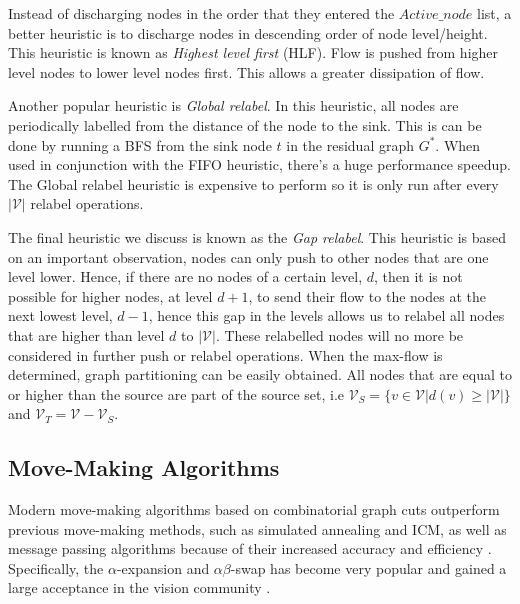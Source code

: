 Instead of discharging nodes in the order that they entered the $Active\_node$ list, a better heuristic is to discharge nodes in descending order of node level/height. This heuristic is known as \textit{Highest level first} (HLF). Flow is pushed from higher level nodes to lower level nodes first. This allows a greater dissipation of flow.

Another popular heuristic is \textit{Global relabel}. In this heuristic, all nodes are periodically labelled from the distance of the node to the sink. This is can be done by running a BFS from the sink node $t$ in the residual graph $G^*$. When used in conjunction with the FIFO heuristic, there's a huge performance speedup. The Global relabel heuristic is expensive to perform so it is only run after every $|\mathcal{V}|$ relabel operations. 

The final heuristic we discuss is known as the \textit{Gap relabel}. This heuristic is based on an important observation, nodes can only push to other nodes that are one level lower. Hence, if there are no nodes of a certain level, $d$, then it is not possible for higher nodes, at level $d+1$, to send their flow to the nodes at the next lowest level, $d-1$, hence this gap in the levels allows us to relabel all nodes that are higher than level $d$ to $|\mathcal{V}|$. These relabelled nodes will no more be considered in further \textsf{push} or \textsf{relabel} operations. When the max-flow is determined, graph partitioning can be easily obtained. All nodes that are equal to or higher than the source are part of the source set, i.e $\mathcal{V}_S=\{v \in \mathcal{V} | d(v)\geq |\mathcal{V}|\}$ and $\mathcal{V}_T = \mathcal{V}-\mathcal{V}_S$.
%


\subsection{Move-Making Algorithms}
\label{sec:movemaking}

Modern move-making algorithms based on combinatorial graph cuts outperform previous move-making methods, such as simulated annealing and ICM, as well as message passing algorithms because of their increased accuracy and efficiency \cite{Szeliski2008}. Specifically, the $\alpha$-expansion and $\alpha\beta$-swap \cite{Boykov2001} has become very popular and gained a large acceptance in the vision community \citep{Vu2008_2}.


